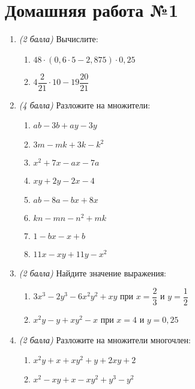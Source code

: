 \documentclass[12pt, a4paper]{article}
\begin{document}
	
	\section*{Домашняя работа №1}
	\begin{enumerate}
		\item \textit{(2 балла)} Вычислите:
			\begin{enumerate}[label=\asbuk*)]
		\item $48\cdot(0,6\cdot5-2,875)\cdot0,25$
		\item $4\dfrac{2}{21}\cdot10-19\dfrac{20}{21}$
			\end{enumerate}
		\item \textit{(4 балла)} Разложите на множители:
		\begin{multicols}{2}
			\begin{enumerate}[label=\asbuk*)]
		\item $ab-3b+ay-3y$ 
		\item $3m-mk+3k-k^2$ 
		\item $x^2+7x-ax-7a$ 
		\item $xy+2y-2x-4$ 
		\item $ab-8a-bx+8x$ 
		\item $kn-mn-n^2+mk$ 
		\item $1-bx-x+b$ 
		\item $11x-xy+11y-x^2$ 
		\end{enumerate}
		\end{multicols}
		\item \textit{(2 балла)} Найдите значение выражения:
		\begin{multicols}{2}
			\begin{enumerate}[label=\asbuk*)]
				\item $3x^3-2y^3-6x^2y^2+xy$ при $x=\dfrac{2}{3}$ и $y=\dfrac{1}{2}$
				\item $x^2y-y+xy^2-x$ при $x=4$ и $y=0,25$
			\end{enumerate}
		\end{multicols}
		\item \textit{(2 балла)} Разложите на множители многочлен:
				\begin{multicols}{2}
				\begin{enumerate}[label=\asbuk*)]
					\item $x^2y+x+xy^2+y+2xy+2$
					\item $x^2-xy+x-xy^2+y^3-y^2$
				\end{enumerate}
			\end{multicols}
	\end{enumerate}
\end{document}

